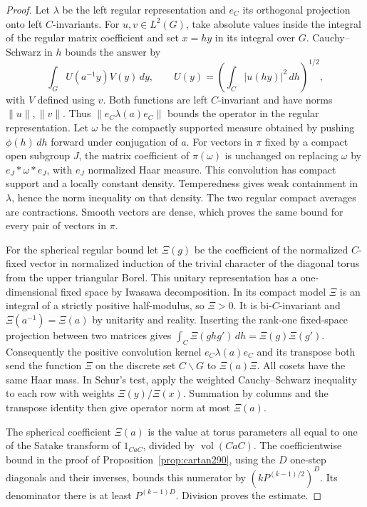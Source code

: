\documentclass[a4paper,11pt]{article}
\theoremstyle{definition}
\theoremstyle{remark}
\numberwithin{equation}{section}
\begin{document}
\begin{proof}
Let \(\lambda\) be the left regular representation and
\(e_C\) its orthogonal projection onto left \(C\)-invariants.
For \(u,v\in L^2(G)\), take absolute values inside the
integral of the regular matrix coefficient and set \(x=hy\)
in its integral over \(G\). Cauchy--Schwarz in \(h\)
bounds the answer by
\[
   \int_G U(a^{-1}y)V(y)\,dy,\qquad
        U(y)=\left(\int_C|u(hy)|^2\,dh\right)^{1/2},
\]
with \(V\) defined using \(v\). Both functions are
left \(C\)-invariant and have norms \(\|u\|,\|v\|\).
Thus \( \|e_C\lambda(a)e_C\|\) bounds the operator
in the regular representation. Let \(\omega\) be the
compactly supported measure obtained by pushing \(\phi(h)\,dh\)
forward under conjugation of \(a\). For vectors in \(\pi\)
fixed by a compact open subgroup \(J\), the matrix
coefficient of \(\pi(\omega)\) is unchanged on replacing
\(\omega\) by \(e_J*\omega*e_J\), with \(e_J\) normalized
Haar measure. This convolution has compact support and a
locally constant density. Temperedness gives weak
containment in \(\lambda\), hence the norm inequality on
that density. The two regular compact averages are
contractions. Smooth vectors are dense, which proves the
same bound for every pair of vectors in \(\pi\).

For the spherical regular bound let \(\Xi(g)\) be the
coefficient of the normalized \(C\)-fixed vector in
normalized induction of the trivial character of the
diagonal torus from the upper triangular Borel. This
unitary representation has a one-dimensional fixed space
by Iwasawa decomposition. In its compact model \(\Xi\)
is an integral of a strictly positive half-modulus, so
\(\Xi>0\). It is bi-\(C\)-invariant and
\(\Xi(a^{-1})=\Xi(a)\) by unitarity and reality. Inserting
the rank-one fixed-space projection between two matrices
gives \(\int_C\Xi(g h g')\,dh=\Xi(g)\Xi(g')\).
Consequently the positive convolution kernel
\(e_C\lambda(a)e_C\) and its transpose both send the
function \(\Xi\) on the discrete set \(C\backslash G\)
to \(\Xi(a)\Xi\). All cosets have the same Haar mass.
In Schur's test, apply the weighted Cauchy--Schwarz
inequality to each row with weights \(\Xi(y)/\Xi(x)\).
Summation by columns and the transpose identity then
give operator norm at most \(\Xi(a)\).

The spherical coefficient \(\Xi(a)\) is the value at
torus parameters all equal to one of the Satake transform
of \(1_{CaC}\), divided by \(\operatorname{vol}(CaC)\).
The coefficientwise bound in the proof of
Proposition~\ref{prop:cartan290}, using the \(D\)
one-step diagonals and their inverses, bounds this numerator
by \((kP^{(k-1)/2})^D\). Its denominator there is at
least \(P^{(k-1)D}\). Division proves the estimate.
\end{proof}
\end{document}
